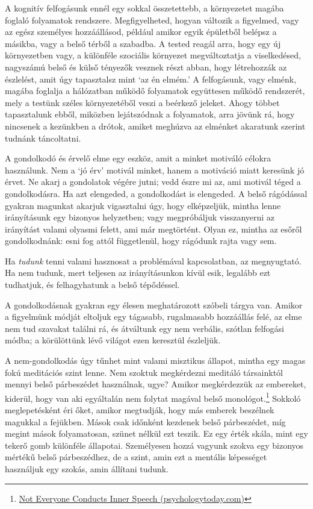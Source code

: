A kognitív felfogásunk ennél egy sokkal összetettebb, a környezetet
magába foglaló folyamatok rendszere. Megfigyelheted, hogyan változik a
figyelmed, vagy az egész személyes hozzáállásod, például amikor egyik
épületből belépsz a másikba, vagy a belső térből a szabadba. A tested
reagál arra, hogy egy új környezetben vagy, a különféle szociális
környezet megváltoztatja a viselkedésed, nagyszámú belső és külső
tényezők vesznek részt abban, hogy létrehozzák az észlelést, amit úgy
tapasztalsz mint `az én elmém.' A felfogásunk, vagy elménk, magába
foglalja a hálózatban működő folyamatok együttesen működő rendszerét,
mely a testünk széles környezetéből veszi a beérkező jeleket. Ahogy
többet tapasztalunk ebből, miközben lejátszódnak a folyamatok, arra
jövünk rá, hogy nincsenek a kezünkben a drótok, amiket meghúzva az
elménket akaratunk szerint tudnánk táncoltatni.

A gondolkodó és érvelő elme egy eszköz, amit a minket motiváló célokra
használunk. Nem a `jó érv' motivál minket, hanem a motiváció miatt
keresünk jó érvet. Ne akarj a gondolatok végére jutni; vedd észre mi az,
ami motivál téged a gondolkodásra. Ha azt elengeded, a gondolkodást is
elengeded. A belső rágódással gyakran magunkat akarjuk vigasztalni úgy,
hogy elképzeljük, mintha lenne irányításunk egy bizonyos helyzetben;
vagy megpróbáljuk visszanyerni az irányítást valami olyasmi felett, ami
már megtörtént. Olyan ez, mintha az esőről gondolkodnánk: esni fog attól
függetlenül, hogy rágódunk rajta vagy sem.

Ha \emph{tudunk} tenni valami hasznosat a problémával kapcsolatban, az
megnyugtató. Ha nem tudunk, mert teljesen az irányításunkon kívül esik,
legalább ezt tudhatjuk, és felhagyhatunk a belső tépődéssel.

A gondolkodásnak gyakran egy élesen meghatározott szóbeli tárgya van.
Amikor a figyelmünk módját eltoljuk egy tágasabb, rugalmasabb hozzáállás
felé, az elme nem tud szavakat találni rá, és átváltunk egy nem
verbális, szótlan felfogási módba; a körülöttünk lévő világot ezen
keresztül észleljük.

A nem-gondolkodás úgy tűnhet mint valami misztikus állapot, mintha egy
magas fokú meditációs szint lenne. Nem szoktuk megkérdezni meditáló
társainktól mennyi belső párbeszédet használnak, ugye? Amikor
megkérdezzük az embereket, kiderül, hogy van aki egyáltalán nem folytat
magával belső monológot.\footnote{\href{https://www.psychologytoday.com/us/blog/pristine-inner-experience/201110/not-everyone-conducts-inner-speech}{Not
  Everyone Conducts Inner Speech (psychologytoday.com)}} Sokkoló
meglepetésként éri őket, amikor megtudják, hogy más emberek beszélnek
magukkal a fejükben. Mások csak időnként kezdenek belső párbeszédet, míg
megint mások folyamatosan, szünet nélkül ezt teszik. Ez egy érték skála,
mint egy tekerő gomb különféle állapotai. Személyesen hozzá vagyunk
szokva egy bizonyos mértékű belső párbeszédhez, de a szint, amin ezt a
mentális képességet használjuk egy szokás, amin állítani tudunk.

